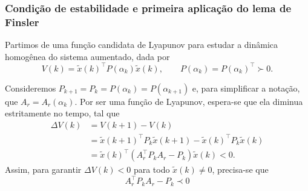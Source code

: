 \subsubsection{Condição de estabilidade e primeira aplicação do lema de Finsler}

Partimos de uma função candidata de Lyapunov para estudar a dinâmica homogênea do sistema aumentado, dada por
\begin{equation}
 V(k)=\widetilde x(k)^\top P(\alpha_k)\widetilde x(k),\qquad P(\alpha_k)=P(\alpha_k)^\top\succ0.
 \label{eq:lmi_lyapunov}
\end{equation}

\noindent
Consideremos $P_{k+1}=P_k=P(\alpha_k)=P(\alpha_{k+1})$ e, para simplificar a notação, que $A_r=A_r(\alpha_k)$. Por ser uma função de Lyapunov, espera-se que ela diminua estritamente no tempo, tal que
\begin{align}
    \Delta V(k) 
    &= V(k+1) - V(k) \\
    &=  \widetilde x(k+1)^\top P_k\widetilde x(k+1) - \widetilde x(k)^\top P_k\widetilde x(k) \\
    &= \widetilde x(k)^\top ( A_r^\top P_{k}A_r-P_k )\widetilde x(k) < 0.
    \label{eq:lmi_lyapunov_diferenca}
\end{align}
Assim, para garantir $\Delta V(k) < 0$ para todo $\widetilde x(k) \neq 0$, precisa-se que
\begin{equation}
    A_r^\top P_{k}A_r-P_k \prec 0
\end{equation}

